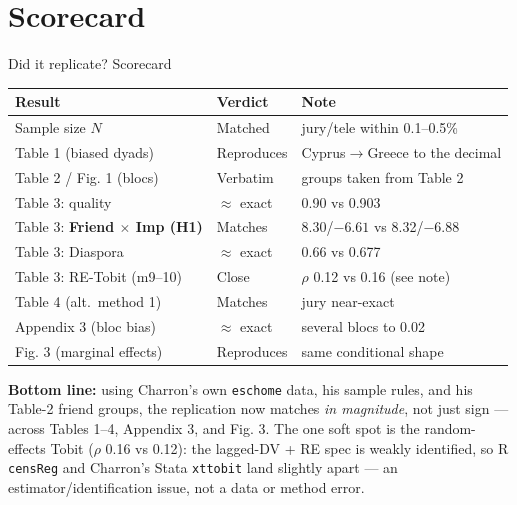 \documentclass[aspectratio=169,10pt]{beamer}
\newcommand{\rep}[1]{{\color{repcol}#1}}
\begin{document}
\section{Scorecard}
\begin{frame}{Did it replicate? Scorecard}
  \centering\small
  \renewcommand{\arraystretch}{1.3}
  \begin{tabular}{@{}l l l@{}}
    \toprule
    Result & Verdict & Note\\
    \midrule
    Sample size $N$ & \rep{Matched} & jury/tele within 0.1--0.5\%\\
    Table 1 (biased dyads) & \rep{Reproduces} & Cyprus$\to$Greece to the decimal\\
    Table 2 / Fig. 1 (blocs) & \rep{Verbatim} & groups taken from Table 2\\
    Table 3: quality & \rep{$\approx$ exact} & 0.90 vs 0.903\\
    Table 3: \textbf{Friend $\times$ Imp (H1)} & \rep{Matches} & 8.30/$-6.61$ vs 8.32/$-6.88$\\
    Table 3: Diaspora & \rep{$\approx$ exact} & 0.66 vs 0.677\\
    Table 3: RE-Tobit (m9--10) & \rep{Close} & $\rho$ 0.12 vs 0.16 (see note)\\
    Table 4 (alt.\ method 1) & \rep{Matches} & jury near-exact\\
    Appendix 3 (bloc bias) & \rep{$\approx$ exact} & several blocs to 0.02\\
    Fig. 3 (marginal effects) & \rep{Reproduces} & same conditional shape\\
    \bottomrule
  \end{tabular}

  \vspace{6pt}
  \footnotesize
  \textbf{Bottom line:} using Charron's own \texttt{eschome} data, his sample rules,
  and his Table-2 friend groups, the replication now matches \emph{in magnitude}, not
  just sign --- across Tables 1--4, Appendix 3, and Fig. 3. The one soft spot is the
  random-effects Tobit ($\rho$ 0.16 vs 0.12): the lagged-DV + RE spec is weakly
  identified, so R \texttt{censReg} and Charron's Stata \texttt{xttobit} land slightly
  apart --- an estimator/identification issue, not a data or method error.
\end{frame}
\end{document}
